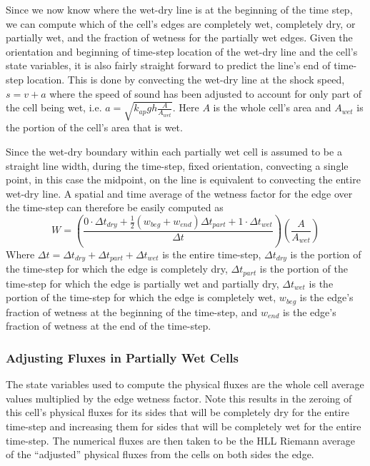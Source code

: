 \documentclass[letterpaper,10pt]{article}
\begin{document}
Since we now know where the wet-dry line is at the beginning of the 
time step, we can compute which of the cell's edges are completely 
wet, completely dry, or partially wet, and the fraction of wetness for 
the partially wet edges.  Given the orientation and beginning of 
time-step location of the wet-dry line and the cell's state variables, 
it is also fairly straight forward to predict the line's end of 
time-step location.  This is done by convecting the wet-dry line at 
the shock speed, $s=v+a$ where the speed of sound has been adjusted 
to account for only part of the cell being wet, i.e. 
$a=\sqrt{k_{ap}gh\frac{A}{A_{wet}}}$.  Here $A$ is the whole cell's 
area and $A_{wet}$ is the portion of the cell's area that is wet.  \newline

Since the wet-dry boundary within each partially wet cell is assumed 
to be a straight line width, during the time-step, fixed orientation, 
convecting a single point, in this case the midpoint, on the line is 
equivalent to convecting the entire wet-dry line.  A spatial and time 
average of the wetness factor for the edge over the time-step can 
therefore be easily computed as
\begin{equation}
W=\left(\frac{0\cdot\Delta t_{dry} +\frac{1}{2}(w_{beg}+w_{end})\Delta t_{part}+1\cdot\Delta t_{wet}}{\Delta t}\right) \left(\frac{A}{A_{wet}}\right)
\label{wetnessfactor}
\end{equation}
Where $\Delta t=\Delta t_{dry}+\Delta t_{part}+\Delta t_{wet}$ is the 
entire time-step, $\Delta t_{dry}$ is the portion of the time-step for 
which the edge is completely dry, $\Delta t_{part}$ is the portion of 
the time-step for which the edge is partially wet and partially dry, 
$\Delta t_{wet}$ is the portion of the time-step for which the edge is 
completely wet, $w_{beg}$ is the edge's fraction of wetness at the 
beginning of the time-step, and $w_{end}$ is the edge's fraction of 
wetness at the end of the time-step.\newline

\subsubsection{Adjusting Fluxes in Partially Wet Cells} \label{adjustfluxes}

The state variables used to compute the physical fluxes are the whole
cell average values multiplied by the edge wetness factor.  Note this 
results in the zeroing of this cell's physical fluxes for its sides 
that will be completely dry for the entire time-step and increasing 
them for sides that will be completely wet for the entire time-step.   
The numerical fluxes are then taken to be the HLL Riemann average of 
the ``adjusted'' physical fluxes from the cells on both sides the edge.  \newline
\end{document}
